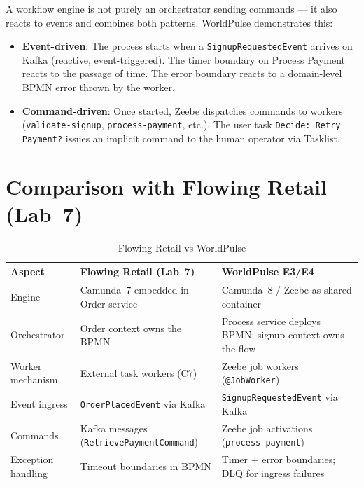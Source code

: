 \documentclass[10pt,a4paper]{article}
\begin{document}
A workflow engine is not purely an orchestrator sending commands --- it also reacts to events and combines both patterns. WorldPulse demonstrates this:

\begin{itemize}
    \item \textbf{Event-driven}: The process starts when a \texttt{SignupRequestedEvent} arrives on Kafka (reactive, event-triggered). The timer boundary on Process Payment reacts to the passage of time. The error boundary reacts to a domain-level BPMN error thrown by the worker.
    \item \textbf{Command-driven}: Once started, Zeebe dispatches commands to workers (\texttt{validate-signup}, \texttt{process-payment}, etc.). The user task \texttt{Decide: Retry Payment?} issues an implicit command to the human operator via Tasklist.
\end{itemize}


\section{Comparison with Flowing Retail (Lab~7)}

\begin{table}[H]
    \centering
    \caption{Flowing Retail vs WorldPulse}
    \small
    \begin{tabular}{
        >{\raggedright\arraybackslash}p{}
        >{\raggedright\arraybackslash}p{}
        >{\raggedright\arraybackslash}p{}
    }
    \toprule
    \textbf{Aspect} & \textbf{Flowing Retail (Lab~7)} & \textbf{WorldPulse E3/E4} \\
    \midrule
    Engine & Camunda~7 embedded in Order service & Camunda~8 / Zeebe as shared container \\
    Orchestrator & Order context owns the BPMN & Process service deploys BPMN; signup context owns the flow \\
    Worker mechanism & External task workers (C7) & Zeebe job workers (\texttt{@JobWorker}) \\
    Event ingress & \texttt{OrderPlacedEvent} via Kafka & \texttt{SignupRequestedEvent} via Kafka \\
    Commands & Kafka messages (\texttt{RetrievePaymentCommand}) & Zeebe job activations (\texttt{process-payment}) \\
    Exception handling & Timeout boundaries in BPMN & Timer + error boundaries; DLQ for ingress failures \\
    \bottomrule
    \end{tabular}
\end{table}
\end{document}
